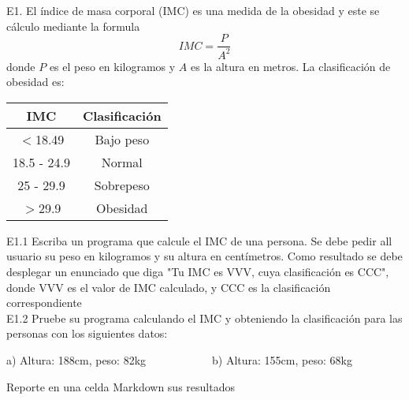 \documentclass[12pt,letterpaper]{report}
\author{Andrés Limón Cruz }
\begin{document}
E1. El índice de masa corporal (IMC) es una medida de la obesidad y este se cálculo mediante la formula
$$
IMC = \frac{P}{A^2}
$$
donde $P$ es el peso en kilogramos y $A$ es la altura en metros. La clasificación de obesidad es:
\begin{center}
\begin{tabular}{|c|c|}
\hline 
IMC & Clasificación \\ 
\hline 
$<$18.49 & Bajo peso \\ 
\hline 
18.5 - 24.9 & Normal \\ 
\hline 
25 - 29.9 & Sobrepeso \\ 
\hline 
$>$29.9 & Obesidad \\ 
\hline 
\end{tabular} 
\end{center}

E1.1 Escriba un programa que calcule el IMC de una persona. Se debe pedir all usuario su peso en kilogramos y su altura en centímetros. Como resultado se debe desplegar un enunciado que diga "Tu IMC es VVV, cuya clasificación es CCC", donde VVV es el valor de IMC calculado, y CCC es la clasificación correspondiente\\

E1.2 Pruebe su programa calculando el IMC y obteniendo la clasificación para las personas con los siguientes datos:
\begin{center}
a) Altura: 188cm, peso: 82kg~~~~~~~~~~~~b) Altura: 155cm, peso: 68kg
\end{center}
Reporte en una celda Markdown sus resultados
\end{document}
